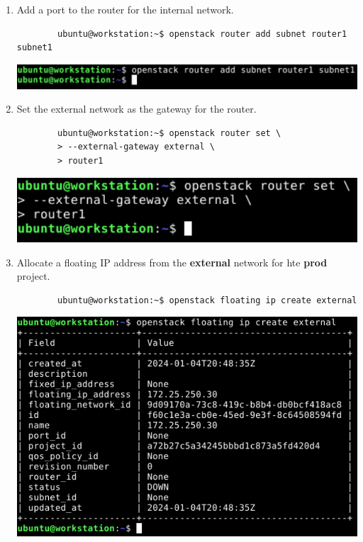 \documentclass[letterpaper, 12pt]{article}
\begin{document}
\begin{enumerate}
    \item Add a port to the router for the internal network.
    \begin{lstlisting}
        ubuntu@workstation:~$ openstack router add subnet router1 subnet1
    \end{lstlisting}

    \begin{center}
        \includegraphics[width=\linewidth]{images/part1/step24.png}
    \end{center}

    \item Set the external network as the gateway for the router.
    \begin{lstlisting}
        ubuntu@workstation:~$ openstack router set \
        > --external-gateway external \
        > router1
    \end{lstlisting}

    \begin{center}
        \includegraphics[width=\linewidth]{images/part1/step25.png}
    \end{center}

    \item Allocate a floating IP address from the \textbf{external} network for hte \textbf{prod} project.
    \begin{lstlisting}
        ubuntu@workstation:~$ openstack floating ip create external
    \end{lstlisting}

    \begin{center}
        \includegraphics[width=\linewidth]{images/part1/step26.png}
    \end{center}


\end{enumerate}
\end{document}
